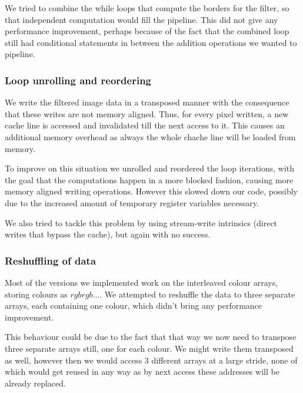 We tried to combine the while loops that compute the borders for the filter, so that independent computation would fill the pipeline. This did not give any performance improvement, perhaps because of the fact that the combined loop still had conditional statements in between the addition operations we wanted to pipeline.

\subsubsection{Loop unrolling and reordering}

We write the filtered image data in a transposed manner with the consequence that these writes are not memory aligned. Thus, for every pixel written, a new cache line is accessed and invalidated till the next access to it. This causes an additional memory overhead as always the whole chache line will be loaded from memory.

To improve on this situation we unrolled and reordered the loop iterations, with the goal that the computations happen in a more blocked fashion, causing more memory aligned writing operations. However this slowed down our code, possibly due to the increased amount of temporary register variables necessary.

We also tried to tackle this problem by using stream-write intrinsics (direct writes that bypass the cache), but again with no success.

\subsubsection{Reshuffling of data}


Most of the versions we implemented work on the interleaved colour arrays, storing colours as $rgbrgb\dots$. We attempted to reshuffle the data to three separate arrays, each containing one colour, which didn't bring any performance improvement. 

This behaviour could be due to the fact that that way we now need to transpose three separate arrays still, one for each colour. We might write them transposed as well, however then we would access 3 different arrays at a large stride, none of which would get reused in any way as by next access these addresses will be already replaced.

